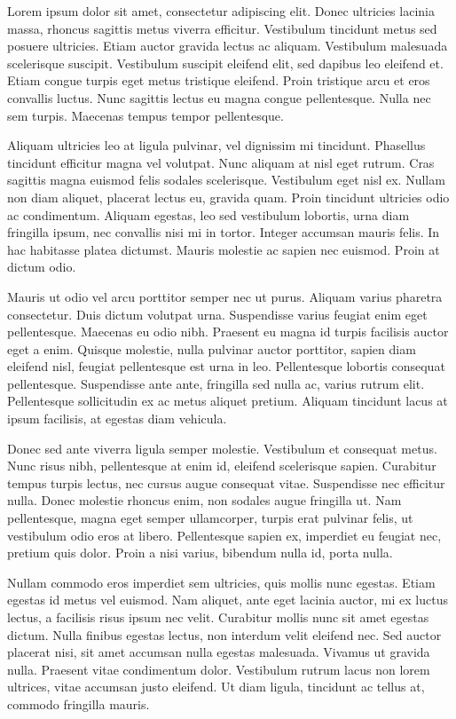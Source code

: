 Lorem ipsum dolor sit amet, consectetur adipiscing elit. Donec ultricies lacinia massa, rhoncus sagittis metus viverra efficitur. Vestibulum tincidunt metus sed posuere ultricies. Etiam auctor gravida lectus ac aliquam. Vestibulum malesuada scelerisque suscipit. Vestibulum suscipit eleifend elit, sed dapibus leo eleifend et. Etiam congue turpis eget metus tristique eleifend. Proin tristique arcu et eros convallis luctus. Nunc sagittis lectus eu magna congue pellentesque. Nulla nec sem turpis. Maecenas tempus tempor pellentesque.

Aliquam ultricies leo at ligula pulvinar, vel dignissim mi tincidunt. Phasellus tincidunt efficitur magna vel volutpat. Nunc aliquam at nisl eget rutrum. Cras sagittis magna euismod felis sodales scelerisque. Vestibulum eget nisl ex. Nullam non diam aliquet, placerat lectus eu, gravida quam. Proin tincidunt ultricies odio ac condimentum. Aliquam egestas, leo sed vestibulum lobortis, urna diam fringilla ipsum, nec convallis nisi mi in tortor. Integer accumsan mauris felis. In hac habitasse platea dictumst. Mauris molestie ac sapien nec euismod. Proin at dictum odio.

Mauris ut odio vel arcu porttitor semper nec ut purus. Aliquam varius pharetra consectetur. Duis dictum volutpat urna. Suspendisse varius feugiat enim eget pellentesque. Maecenas eu odio nibh. Praesent eu magna id turpis facilisis auctor eget a enim. Quisque molestie, nulla pulvinar auctor porttitor, sapien diam eleifend nisl, feugiat pellentesque est urna in leo. Pellentesque lobortis consequat pellentesque. Suspendisse ante ante, fringilla sed nulla ac, varius rutrum elit. Pellentesque sollicitudin ex ac metus aliquet pretium. Aliquam tincidunt lacus at ipsum facilisis, at egestas diam vehicula.

Donec sed ante viverra ligula semper molestie. Vestibulum et consequat metus. Nunc risus nibh, pellentesque at enim id, eleifend scelerisque sapien. Curabitur tempus turpis lectus, nec cursus augue consequat vitae. Suspendisse nec efficitur nulla. Donec molestie rhoncus enim, non sodales augue fringilla ut. Nam pellentesque, magna eget semper ullamcorper, turpis erat pulvinar felis, ut vestibulum odio eros at libero. Pellentesque sapien ex, imperdiet eu feugiat nec, pretium quis dolor. Proin a nisi varius, bibendum nulla id, porta nulla.

Nullam commodo eros imperdiet sem ultricies, quis mollis nunc egestas. Etiam egestas id metus vel euismod. Nam aliquet, ante eget lacinia auctor, mi ex luctus lectus, a facilisis risus ipsum nec velit. Curabitur mollis nunc sit amet egestas dictum. Nulla finibus egestas lectus, non interdum velit eleifend nec. Sed auctor placerat nisi, sit amet accumsan nulla egestas malesuada. Vivamus ut gravida nulla. Praesent vitae condimentum dolor. Vestibulum rutrum lacus non lorem ultrices, vitae accumsan justo eleifend. Ut diam ligula, tincidunt ac tellus at, commodo fringilla mauris.
